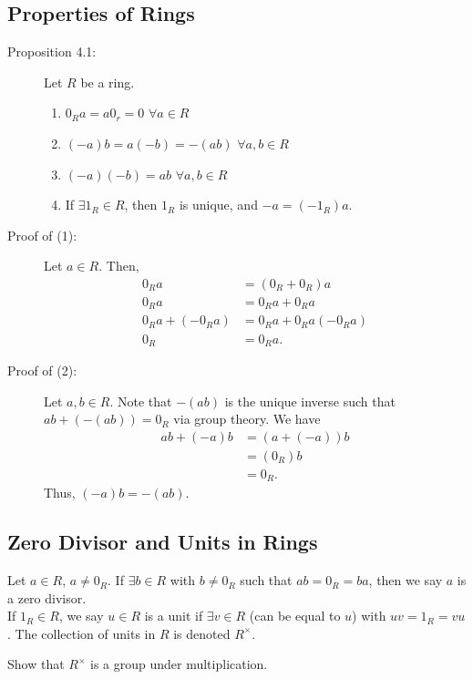 \documentclass[10pt]{extarticle}
\begin{document}
  \subsection{Properties of Rings}%
  \begin{description}
    \item[Proposition 4.1:] Let $R$ be a ring.
      \begin{enumerate}[(1)]
        \item $0_R a = a0_r = 0$ $\forall a\in R$
        \item $(-a)b = a(-b) = -(ab)$ $\forall a,b\in R$
        \item $(-a)(-b) = ab$ $\forall a,b\in R$
        \item If $\exists 1_R\in R$, then $1_R$ is unique, and $-a = (-1_R)a$.
      \end{enumerate}
    \item[Proof of (1):] Let $a\in R$. Then,
      \begin{align*}
        0_Ra &= (0_R + 0_R)a \tag*{Additive Inverse}\\
        0_Ra &= 0_Ra + 0_Ra \tag*{Distributivity}\\
        0_Ra + (-0_Ra) &= 0_Ra + 0_Ra (-0_Ra)\\
        0_R &= 0_Ra. \tag*{Additive Inverse}
      \end{align*}
    \item[Proof of (2):] Let $a,b\in R$. Note that $-(ab)$ is the unique inverse such that $ab + (-(ab)) = 0_R$ via group theory. We have
      \begin{align*}
        ab + (-a)b &= (a+(-a))b \tag*{Distributivity}\\
                   &= (0_R)b\tag*{Additive Inverse}\\
                   &= 0_R. \tag*{By Property (1)}
      \end{align*}
      Thus, $(-a)b = -(ab)$.
  \end{description}
  \subsection{Zero Divisor and Units in Rings}%
    Let $a\in R$, $a\neq 0_R$. If $\exists b\in R$ with $b\neq 0_R$ such that $ab = 0_R = ba$, then we say $a$ is a zero divisor.\\

    If $1_R \in R$, we say $u\in R$ is a unit if $\exists v\in R$ (can be equal to $u$) with $uv = 1_R = vu$. The collection of units in $R$ is denoted $R^{\times}$.
    \begin{description}
      \tiny
      \item[Exercise:] Show that $R^{\times}$ is a group under multiplication.
    \end{description}
\end{document}
